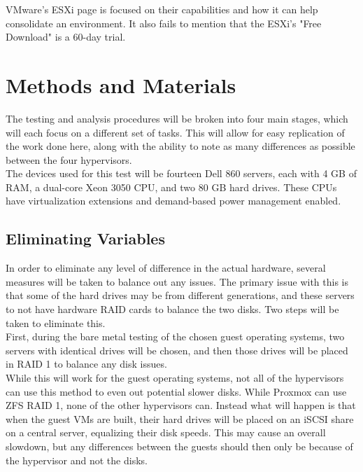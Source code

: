 \documentclass[12pt]{spieman}  %
\begin{document}
VMware's ESXi page is focused on their capabilities and how it can help consolidate an environment. It also fails to mention that the ESXi's "Free Download" is a 60-day  trial.\cite{vmwareweb}

\section{Methods and Materials}
\label{sec:met-mat}

The testing and analysis procedures will be broken into four main stages, which will each focus on a different set of tasks. This will allow for easy replication of the work done here, along with the ability to note as many differences as possible between the four hypervisors.\\

The devices used for this test will be fourteen Dell 860 servers, each with 4 GB of RAM, a dual-core Xeon 3050 CPU, and two 80 GB hard drives. These CPUs have virtualization extensions and demand-based power management enabled.

\subsection{Eliminating Variables}
\label{subsec:variables}

In order to eliminate any level of difference in the actual hardware, several measures will be taken to balance out any issues. The primary issue with this is that some of the hard drives may be from different generations, and these servers to not have hardware RAID cards to balance the two disks.  Two steps will be taken to eliminate this.\\

First, during the bare metal testing of the chosen guest operating systems, two servers with identical drives will be chosen, and then those drives will be placed in RAID 1 to balance any disk issues.\\

While this will work for the guest operating systems, not all of the hypervisors can use this method to even out potential slower disks. While Proxmox can use ZFS RAID 1, none of the other hypervisors can. Instead what will happen is that when the guest VMs are built, their hard drives will be placed on an iSCSI share on a central server, equalizing their disk speeds. This may cause an overall slowdown, but any differences between the guests should then only be because of the hypervisor and not the disks.
\end{document}
